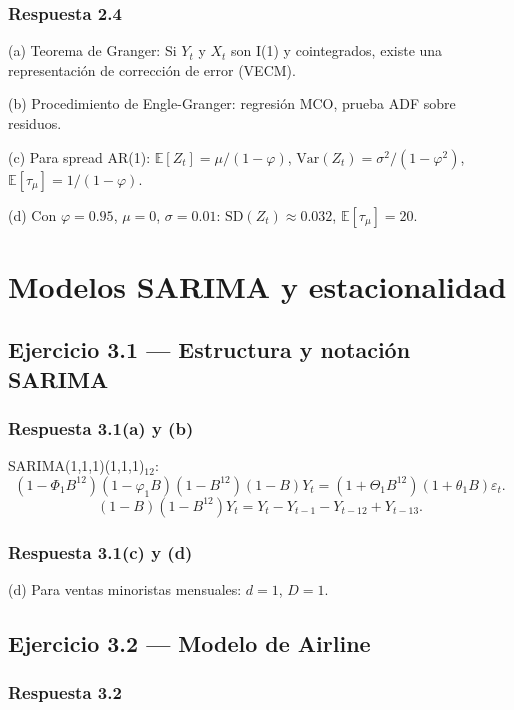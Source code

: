 \documentclass[12pt, letterpaper]{article}
\begin{document}
\subsubsection*{Respuesta 2.4}

(a) Teorema de Granger: Si $Y_t$ y $X_t$ son I(1) y cointegrados, existe una representación de corrección de error (VECM).

(b) Procedimiento de Engle-Granger: regresión MCO, prueba ADF sobre residuos.

(c) Para spread AR(1): $\mathbb{E}[Z_t]=\mu/(1-\varphi)$, $\text{Var}(Z_t)=\sigma^2/(1-\varphi^2)$, $\mathbb{E}[\tau_\mu]=1/(1-\varphi)$.

(d) Con $\varphi=0.95$, $\mu=0$, $\sigma=0.01$: $\text{SD}(Z_t)\approx0.032$, $\mathbb{E}[\tau_\mu]=20$.

\newpage
\section{Modelos SARIMA y estacionalidad}

\subsection{Ejercicio 3.1 — Estructura y notación SARIMA}

\subsubsection*{Respuesta 3.1(a) y (b)}

SARIMA(1,1,1)(1,1,1)$_{12}$:
\[
(1-\Phi_1 B^{12})(1-\varphi_1 B)(1-B^{12})(1-B)Y_t = (1+\Theta_1 B^{12})(1+\theta_1 B)\varepsilon_t.
\]
\[
(1-B)(1-B^{12})Y_t = Y_t - Y_{t-1} - Y_{t-12} + Y_{t-13}.
\]

\subsubsection*{Respuesta 3.1(c) y (d)}

(d) Para ventas minoristas mensuales: $d=1$, $D=1$.

\subsection{Ejercicio 3.2 — Modelo de Airline}

\subsubsection*{Respuesta 3.2}
\end{document}
